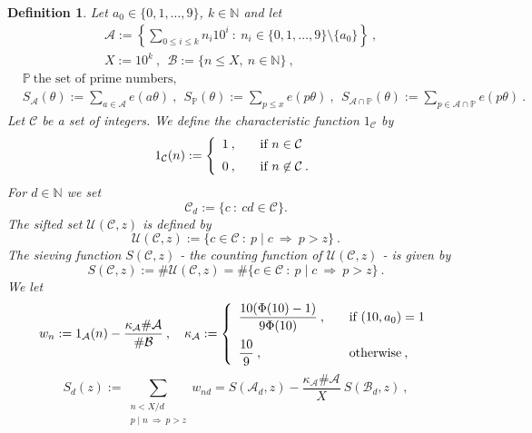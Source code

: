 \documentclass{amsart}
\numberwithin{equation}{subsection}
\newtheorem{definition}[theorem]{Definition}
\begin{document}
\begin{definition}\label{def21}
Let $a_0\in\{0,1,\ldots,9\}$, $k\in\mathbb{N}$ and let
\begin{align*}
&\mathcal{A}:=\left\{  \sum_{0\leq i\leq k} n_i 10^i \::\: n_i\in\{0,1,\ldots,9\}\setminus \{a_0\}\right\} \:,\\
&X:=10^k\:,\ \ \mathcal{B}:=\{n\leq X,\ n\in\mathbb{N}\}\:,
\end{align*}
\begin{align*}
&\mathbb{P}\ \text{the set of prime numbers},\\
&S_{\mathcal{A}}(\theta):=\sum_{a\in\mathcal{A}} e(a\theta)\:,\ \ 
S_{\mathbb{P}}(\theta):=\sum_{p\leq x}e(p\theta)\:,\ \ 
S_{\mathcal{A}\cap\mathbb{P}}(\theta):=\sum_{p\in \mathcal{A}\cap \mathbb{P}}e(p\theta)\:.
\end{align*}
Let $\mathcal{C}$ be a set of integers. We define the characteristic function $1_{\mathcal{C}}$ by
\begin{eqnarray}
1_{\mathcal{C}}(n):=\left\{ 
  \begin{array}{l l}
    1\:, & \quad \text{if $n\in \mathcal{C}$}\vspace{2mm}\\ 
    0\:, & \quad \text{if $n\not\in \mathcal{C}$}\:.\\
  \end{array} \right.
\nonumber
\end{eqnarray}
For $d\in\mathbb{N}$ we set
$$\mathcal{C}_d:=\{c\::\: cd\in\mathcal{C}\}.$$
The sifted set $\mathcal{U}(\mathcal{C}, z)$ is defined by
$$\mathcal{U}(\mathcal{C}, z):=\{c\in\mathcal{C}\::\: p\mid c\ \Rightarrow\ p>z\}\:.$$
The sieving function $S(\mathcal{C}, z)$ - the counting function of $\mathcal{U}(\mathcal{C}, z)$ - is given by
$$S(\mathcal{C}, z):=\#\mathcal{U}(\mathcal{C}, z)=\#\{c\in \mathcal{C}\::\: p\mid c\ \Rightarrow \ p>z\}\:.$$
We let
\begin{eqnarray}
w_n:=1_{\mathcal{A}}(n)-\frac{\kappa_{\mathcal{A}}\#\mathcal{A}}{\#\mathcal{B}}\:,\ \ \ 
\kappa_{\mathcal{A}}:=\left\{ 
  \begin{array}{l l}
    \dfrac{10(\Phi(10)-1)}{9\Phi(10)}\:, & \quad \text{if $(10,a_0)=1$}\vspace{2mm}\\ 
    \dfrac{10}{9}\:, & \quad \text{otherwise}\:,\\
  \end{array} \right.
\nonumber
\end{eqnarray}
$$S_d(z):=\sum_{\substack{n<X/d\\ p\mid n\ \Rightarrow\ p>z}} w_{nd}=S(\mathcal{A}_d, z)-\frac{\kappa_{\mathcal{A}} \#\mathcal{A}}{X}\: S(\mathcal{B}_d, z)\:,$$

\end{definition}
\end{document}
